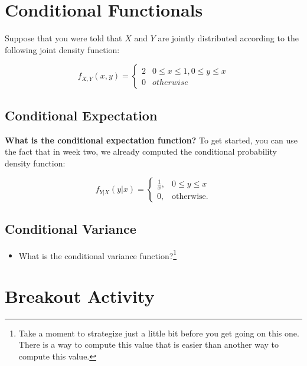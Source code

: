 \documentclass[
]{book}
\providecommand{\tightlist}{%
  \setlength{\itemsep}{0pt}\setlength{\parskip}{0pt}}
\theoremstyle{definition}
\theoremstyle{definition}
\theoremstyle{definition}
\theoremstyle{definition}
\theoremstyle{remark}
\begin{document}
\hypertarget{conditional-functionals}{%
\section{Conditional Functionals}\label{conditional-functionals}}

Suppose that you were told that \(X\) and \(Y\) are jointly distributed according to the following joint density function:

\[ 
  f_{X,Y}(x,y) = 
    \begin{cases}
      2 & 0 \leq x \leq 1, 0 \leq y \leq x \\ 
      0 & otherwise
    \end{cases}
\]

\hypertarget{conditional-expectation}{%
\subsection{Conditional Expectation}\label{conditional-expectation}}

\textbf{What is the conditional expectation function?} To get started, you can use the fact that in week two, we already computed the conditional probability density function:

\[
f_{Y|X}(y|x) = \begin{cases}
  \frac{1}{x}, & 0 \leq y \leq x \\ 
  0,           & \text{otherwise.}
\end{cases}
\]

\vspace{10cm}

\hypertarget{conditional-variance}{%
\subsection{Conditional Variance}\label{conditional-variance}}

\begin{itemize}
\tightlist
\item
  What is the conditional variance function?\footnote{Take a moment to strategize just a little bit before you get going on this one. There is a way to compute this value that is easier than another way to compute this value.}
\end{itemize}

\vspace{20cm}

\hypertarget{breakout-activity}{%
\section{Breakout Activity}\label{breakout-activity}}
\end{document}
